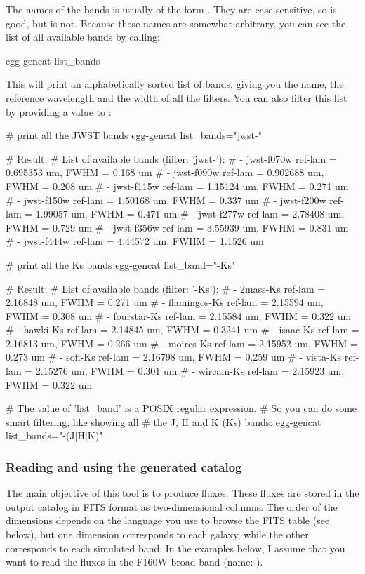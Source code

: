 The names of the bands is usually of the form \bashinline{[instrument]-[band]}. They are case-sensitive, so  is good, but  is not. Because these names are somewhat arbitrary, you can see the list of all available bands by calling:
\begin{bashcode}
egg-gencat list_bands
\end{bashcode}
This will print an alphabetically sorted list of bands, giving you the name, the reference wavelength and the width of all the filters. You can also filter this list by providing a value to :
\begin{bashcode}
# print all the JWST bands
egg-gencat list_bands="jwst-"

# Result:
# List of available bands (filter: 'jwst-'):
#  - jwst-f070w  ref-lam = 0.695353 um, FWHM = 0.168 um
#  - jwst-f090w  ref-lam = 0.902688 um, FWHM = 0.208 um
#  - jwst-f115w  ref-lam = 1.15124 um,  FWHM = 0.271 um
#  - jwst-f150w  ref-lam = 1.50168 um,  FWHM = 0.337 um
#  - jwst-f200w  ref-lam = 1.99057 um,  FWHM = 0.471 um
#  - jwst-f277w  ref-lam = 2.78408 um,  FWHM = 0.729 um
#  - jwst-f356w  ref-lam = 3.55939 um,  FWHM = 0.831 um
#  - jwst-f444w  ref-lam = 4.44572 um,  FWHM = 1.1526 um


# print all the Ks bands
egg-gencat list_band="-Ks"

# Result:
# List of available bands (filter: '-Ks'):
#  - 2mass-Ks      ref-lam = 2.16848 um, FWHM = 0.271 um
#  - flamingos-Ks  ref-lam = 2.15594 um, FWHM = 0.308 um
#  - fourstar-Ks   ref-lam = 2.15584 um, FWHM = 0.322 um
#  - hawki-Ks      ref-lam = 2.14845 um, FWHM = 0.3241 um
#  - isaac-Ks      ref-lam = 2.16813 um, FWHM = 0.266 um
#  - moircs-Ks     ref-lam = 2.15952 um, FWHM = 0.273 um
#  - sofi-Ks       ref-lam = 2.16798 um, FWHM = 0.259 um
#  - vista-Ks      ref-lam = 2.15276 um, FWHM = 0.301 um
#  - wircam-Ks     ref-lam = 2.15923 um, FWHM = 0.322 um

# The value of 'list_band' is a POSIX regular expression.
# So you can do some smart filtering, like showing all
# the J, H and K (Ks) bands:
egg-gencat list_bands="-(J|H|K)"
\end{bashcode}

\subsubsection{Reading and using the generated catalog}

The main objective of this tool is to produce fluxes. These fluxes are stored in the output catalog in FITS format as two-dimensional columns. The order of the dimensions depends on the language you use to browse the FITS table (see below), but one dimension corresponds to each galaxy, while the other corresponds to each simulated band. In the examples below, I assume that you want to read the fluxes in the \hubble F160W broad band (name: ).

